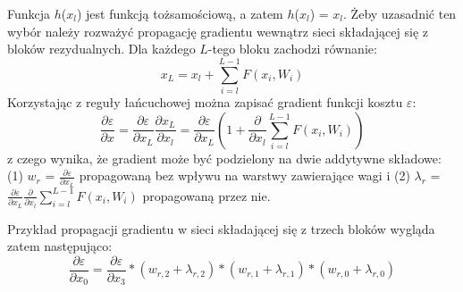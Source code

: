 Funkcja $h$($x_l$) jest funkcją tożsamościową, a zatem $h$($x_l$) = $x_l$. Żeby uzasadnić ten wybór należy rozważyć propagację gradientu wewnątrz sieci składającej się \linebreak z bloków rezydualnych. Dla każdego $L$-tego bloku zachodzi równanie:
\begin{equation}
x_L = x_l + \sum_{i=l}^{L-1}F(x_i, W_i)
\end{equation}
Korzystając z reguły łańcuchowej można zapisać gradient funkcji kosztu $\varepsilon$:
\begin{equation}
\label{gradResBlock}
\frac{\partial \varepsilon}{\partial x} =  \frac{\partial \varepsilon}{\partial x_L} \frac{\partial x_L}{\partial x_l} =  \frac{\partial \varepsilon}{\partial x_L}\left (1 +   \frac{\partial }{\partial x_l}\sum_{i=l}^{L-1}F(x_i, W_i) \right )
\end{equation}
z czego wynika, że gradient może być podzielony na dwie addytywne składowe: (1) $w_r$ = $\frac{\partial \varepsilon}{\partial x_L}$ propagowaną bez wpływu na warstwy zawierające wagi i (2) $\lambda_r$ = $\frac{\partial \varepsilon}{\partial x_L}\frac{\partial }{\partial x_l}\sum_{i=l}^{L-1}F(x_i, W_i)$ propagowaną przez nie.

Przykład propagacji gradientu w sieci składającej się z trzech bloków wygląda zatem następująco:
\begin{equation}
\label{gradRes3Block}
\frac{\partial \varepsilon}{\partial x_0} =  \frac{\partial \varepsilon}{\partial x_3}*(w_{r,2}+\lambda_{r,2})*(w_{r,1}+\lambda_{r,1})*(w_{r,0}+\lambda_{r,0})
\end{equation}

